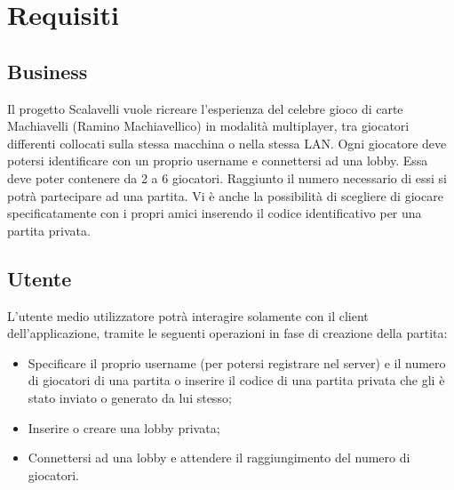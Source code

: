 \documentclass[a4paper,10pt]{article}
\begin{document}
    \newpage


    \section{Requisiti}\label{sec:requisiti}

    \subsection{Business}\label{subsec:business}
    Il progetto Scalavelli vuole ricreare l’esperienza del celebre gioco di carte Machiavelli (Ramino Machiavellico) in modalità multiplayer, tra giocatori differenti collocati sulla stessa macchina o nella stessa LAN. Ogni giocatore deve potersi identificare con un proprio username e connettersi ad una lobby.
    Essa deve poter contenere da 2 a 6 giocatori.
    Raggiunto il numero necessario di essi si potrà partecipare ad una partita.
    Vi è anche la possibilità di scegliere di giocare specificatamente con i propri amici inserendo il codice identificativo per una partita privata.

    \subsection{Utente}\label{subsec:utente}
    L’utente medio utilizzatore potrà interagire solamente con il client dell’applicazione, tramite le seguenti operazioni in fase di creazione della partita:
    \begin{itemize}
        \item Specificare il proprio username (per potersi registrare nel server) e il numero di giocatori di una partita o inserire il codice di una partita privata che gli è stato inviato o generato da lui stesso;
        \item Inserire o creare una lobby privata;
        \item Connettersi ad una lobby e attendere il raggiungimento del numero di giocatori.
    \end{itemize}
\end{document}

